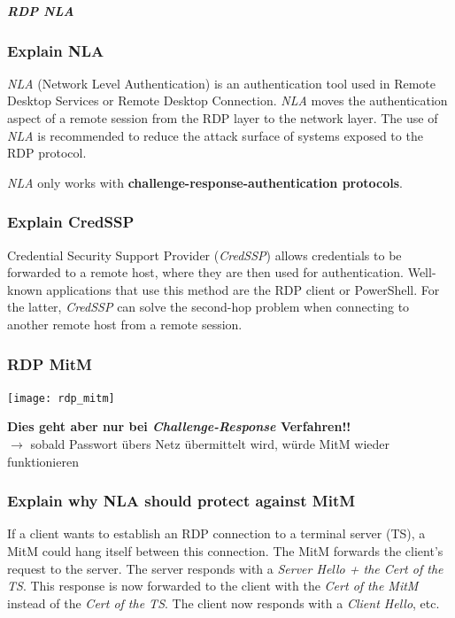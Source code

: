 \subparagraph{RDP NLA}

\subsubsection{Explain NLA}
\textit{NLA} (Network Level Authentication) is an authentication tool used in Remote Desktop Services or Remote Desktop Connection.
\textit{NLA} moves the authentication aspect of a remote session from the RDP layer to the network layer. The use of \textit{NLA} is recommended to reduce the attack surface of systems exposed to the RDP protocol.

\textit{NLA} only works with \textbf{challenge-response-authentication protocols}.

\subsubsection{Explain CredSSP}
Credential Security Support Provider (\textit{CredSSP}) allows credentials to be forwarded to a remote host, where they are then used for authentication. Well-known applications that use this method are the RDP client or PowerShell. For the latter, \textit{CredSSP} can solve the second-hop problem when connecting to another remote host from a remote session.

\subsubsection{RDP MitM}
\begin{center}
    \texttt{[image: rdp\_mitm]}
\end{center}

\textbf{Dies geht aber nur bei \textit{Challenge-Response} Verfahren!!}\\
$\rightarrow$ sobald Passwort übers Netz übermittelt wird, würde MitM wieder funktionieren

\subsubsection{Explain why NLA should protect against MitM}
If a client wants to establish an RDP connection to a terminal server (TS), a MitM could hang itself between this connection. The MitM forwards the client's request to the server. The server responds with a \textit{Server Hello + the Cert of the TS}. This response is now forwarded to the client with the \textit{Cert of the MitM} instead of the \textit{Cert of the TS}. The client now responds with a \textit{Client Hello}, etc.

